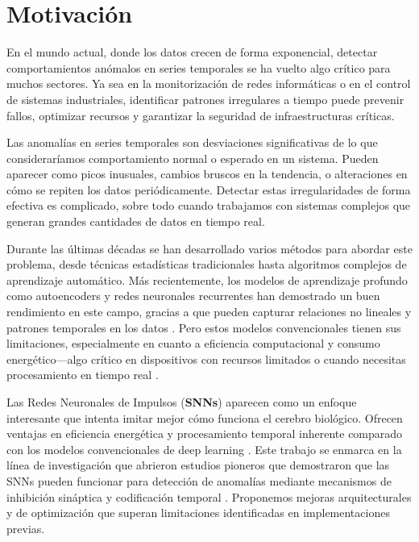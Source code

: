 \section{Motivación}

En el mundo actual, donde los datos crecen de forma exponencial, detectar comportamientos anómalos en series temporales se ha vuelto algo crítico para muchos sectores. Ya sea en la monitorización de redes informáticas o en el control de sistemas industriales, identificar patrones irregulares a tiempo puede prevenir fallos, optimizar recursos y garantizar la seguridad de infraestructuras críticas.

Las anomalías en series temporales son desviaciones significativas de lo que consideraríamos comportamiento normal o esperado en un sistema. Pueden aparecer como picos inusuales, cambios bruscos en la tendencia, o alteraciones en cómo se repiten los datos periódicamente. Detectar estas irregularidades de forma efectiva es complicado, sobre todo cuando trabajamos con sistemas complejos que generan grandes cantidades de datos en tiempo real. 

Durante las últimas décadas se han desarrollado varios métodos para abordar este problema, desde técnicas estadísticas tradicionales hasta algoritmos complejos de aprendizaje automático. Más recientemente, los modelos de aprendizaje profundo como autoencoders y redes neuronales recurrentes han demostrado un buen rendimiento en este campo, gracias a que pueden capturar relaciones no lineales y patrones temporales en los datos \cite{cherdo_time_2023,kshirasagar_auditory_2024}. Pero estos modelos convencionales tienen sus limitaciones, especialmente en cuanto a eficiencia computacional y consumo energético—algo crítico en dispositivos con recursos limitados o cuando necesitas procesamiento en tiempo real \cite{kshirasagar_auditory_2024,plummer_2d_2025}. 

Las Redes Neuronales de Impulsos (\textbf{SNNs}) aparecen como un enfoque interesante que intenta imitar mejor cómo funciona el cerebro biológico. Ofrecen ventajas en eficiencia energética y procesamiento temporal inherente comparado con los modelos convencionales de deep learning \cite{lv_efficient_2024,yusob_anomaly_2018,basler_unsupervised_2022}. Este trabajo se enmarca en la línea de investigación que abrieron estudios pioneros que demostraron que las SNNs pueden funcionar para detección de anomalías mediante mecanismos de inhibición sináptica y codificación temporal \cite{cherdo_time_2023,yusob_anomaly_2018,basler_unsupervised_2022}. Proponemos mejoras arquitecturales y de optimización que superan limitaciones identificadas en implementaciones previas. 

